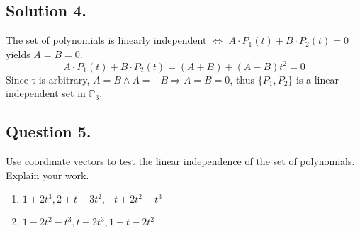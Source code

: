 \documentclass{article}
\begin{document}
\subsection*{Solution 4.}
The set of polynomials is linearly independent $\Leftrightarrow$ $A\cdot P_1(t)+B\cdot P_2(t)=0$ yields $A=B=0$. 
\[A\cdot P_1(t)+B\cdot P_2(t)=(A+B)+(A-B)t^2=0\]
Since t is arbitrary, $A=B\land A=-B\Rightarrow A=B=0$, thus $\{P_1,P_2\}$ is a linear independent set in $\mathbb{P}_3$.
\subsection*{Question 5.}
Use coordinate vectors to test the linear independence of the set of polynomials. Explain your work.
\begin{enumerate}
    \item $1+2t^3 , 2+t-3t^2 , -t+2t^2-t^3$
    \item $1-2t^2-t^3,t+2t^3,1+t-2t^2$
\end{enumerate}
\end{document}
